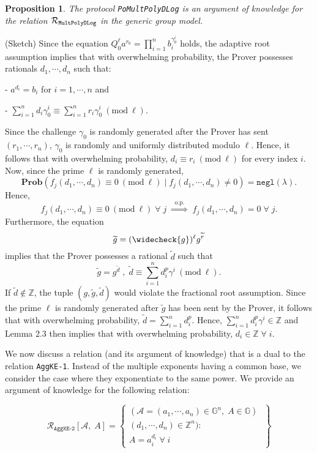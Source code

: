 \documentclass[11pt, lettersize, notitlepage, leqno, footskip=0.6cm]{article}
\newcommand{\bz}{\mathbb Z}
\newcommand{\pl}{\prod\limits}
\newcommand{\slim}{\sum\limits}
\newcommand{\ttt}{\texttt}
\newcommand{\negl}{\ttt{{negl}}}
\newcommand{\impop}{\overset{\;\;\mr{o.p.}\;\;}{\Longrightarrow}}
\newcommand{\wti}{\widetilde}
\newcommand{\mc}{\mathcal}
\newcommand{\mb}{\mathbb}
\newcommand{\mbf}{\mathbf}
\newcommand{\mr}{\mathrm}
\newcommand{\lam}{\lambda}
\newcommand{\weck}{\widecheck}
\newcommand{\Prob}{\mbf{Prob}}
\newcommand{\vs}{\vspace{-0.15cm}}
\newcommand{\noin}{\noindent}
\newcommand{\op}{overwhelming probability}
\newcommand{\Mod}[1]{\ (\mathrm{mod}\ #1)}
\newtheorem{Prop}[Thm]{Proposition}
\numberwithin{equation}{section}
\begin{document}
 \vspace{0.2cm}


\begin{Prop} The protocol \verb|PoMultPolyDLog| is an argument of knowledge for the relation $\mc{R}_{{\tt{MultPolyDLog}}}$ in the generic group model.\end{Prop}

\begin{prf} (Sketch) Since the equation $Q_0^{\ell} a^{r_0} = \pl_{i=1}^n b_i^{\gamma_0^i}$ holds, the adaptive root assumption implies that with \op, the Prover possesses rationals $d_1,\cdots,d_n$ such that: 

\noin - $a^{d_i} = b_i$ for $i=1,\cdots,n$ and 

\noin - $\sum\limits_{i=1}^n d_i\gamma_0^i\equiv \sum\limits_{i=1}^n r_i\gamma_0^i\Mod{\ell}.$ 

Since the challenge $\gamma_0$ is randomly generated after the Prover has sent $(r_1,\cdots,r_n)$, $\gamma_0$ is randomly and uniformly distributed modulo $\ell$. Hence, it follows that with \op, $d_i\equiv r_i\Mod{\ell}$ for every index $i$. Now, since the prime $\ell$ is randomly generated, \vs $$\Prob\left(f_j(d_1,\cdots,d_n)\equiv 0\Mod{\ell} \;\Big|\; f_j(d_1,\cdots,d_n)\neq 0 \right) = \negl(\lam) .$$ Hence, $$f_j(d_1,\cdots,d_n)\equiv 0\Mod{\ell}\;\forall\;j\;\impop\; f_j(d_1,\cdots,d_n) = 0 \;\forall\;j.$$ Furthermore, the equation \vs $$\wti{g} = (\weck{g})^{\ell}g^{\wti{r}} $$ implies that the Prover possesses a rational $\wti{d}$ such that \vs $$\wti{g} = g^{\wti{d}}\;,\;\wti{d}\equiv \slim_{i=1}^n d_i^p\gamma^i\Mod{\ell}.$$ If $\wti{d}\notin\bz$, the tuple $(g, \wti{g}, \wti{d})$ would violate the fractional root assumption. Since the prime $\ell$ is randomly generated after $\wti{g}$ has been sent by the Prover, it follows that with \op, $\wti{d} = \slim_{i=1}^n d_i^p.$ Hence, $\slim_{i=1}^n d_i^p\gamma^i\in \bz$ and Lemma 2.3 then implies that with \op, $ d_i\in \bz\;\forall\;i$. \end{prf} 

\vspace{0.2cm}

\noindent We now discuss a relation (and its argument of knowledge) that is a dual to the relation \verb|AggKE-1|. Instead of the multiple exponents having a common base, we consider the case where they exponentiate to the same power. We provide an argument of knowledge for the following relation: 

\[
  \mc{R}_{{\ttt{AggKE-2}}}[\mc{A},\;A] = \left\{\begin{array}{l}
    (\mc{A} = (a_1,\cdots, a_n)\in \mb{G}^n,\; A\in\mb{G})\;\\ 
    (d_1,\cdots,d_n)\in\bz^n) :  \\
     A = a_i^{d_i}\;\forall\; i
  \end{array}\right\}
\]
\vspace{0.1cm}
\end{document}
